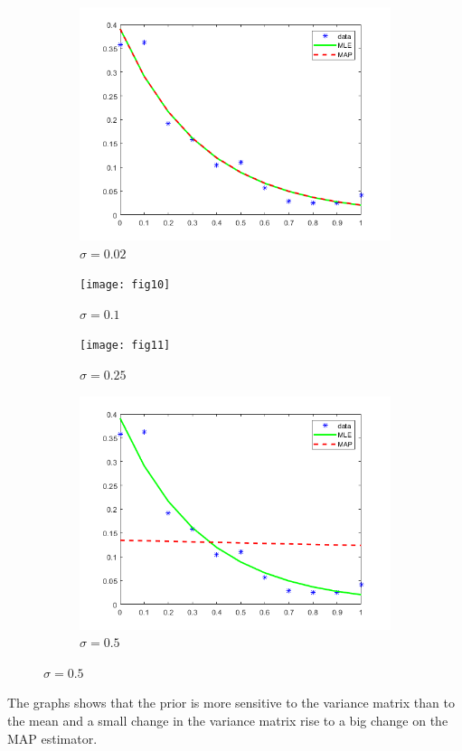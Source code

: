 \documentclass[11pt,a4paper]{article}
\begin{document}
\begin{enumerate}
\begin{itemize}
\begin{figure}[H]
	\centering
	\begin{subfigure}{0.4\textwidth}
		\includegraphics[width=\textwidth]{fig9}
		\caption{$ \sigma  = 0.02$}
		\label{fig4:first}
	\end{subfigure}
	\begin{subfigure}{0.4\textwidth}
		\texttt{[image: fig10]}
		\caption{$ \sigma  = 0.1$}
		\label{fig4:first}
	\end{subfigure}
	\begin{subfigure}{0.4\textwidth}
		\texttt{[image: fig11]}
		\caption{$\sigma  = 0.25$}
		\label{fig4:first}
	\end{subfigure}
	\begin{subfigure}{0.4\textwidth}
		\includegraphics[width=\textwidth]{fig12}
		\caption{$ \sigma  = 0.5$}
		\label{fig4:first}
	\end{subfigure}
\end{figure}
\end{itemize}
The graphs shows that the prior is more sensitive to the variance matrix than to the mean and a small change in the variance matrix rise to a big change on the MAP estimator. 
\end{enumerate}
\end{document}
